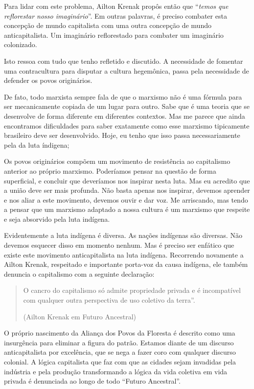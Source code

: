 Para lidar com este problema, Ailton Krenak propôs então que “\textit{temos que reflorestar nosso imaginário}”. Em outras palavras, é preciso combater esta concepção de mundo capitalista com uma outra concepção de mundo anticapitalista. Um imaginário reflorestado para combater um imaginário colonizado.

Isto ressoa com tudo que tenho refletido e discutido. A necessidade de fomentar uma contracultura para disputar a cultura hegemônica, passa pela necessidade de defender os povos originários.

De fato, todo marxista sempre fala de que o marxismo não é uma fórmula para ser mecanicamente copiada de um lugar para outro. Sabe que é uma teoria que se desenvolve de forma diferente em diferentes contextos. Mas me parece que ainda encontramos dificuldades para saber exatamente como esse marxismo tipicamente brasileiro deve ser desenvolvido. Hoje, eu tenho que isso passa necessariamente pela da luta índigena;

Os povos originários compõem um movimento de resistência ao capitalismo anterior ao próprio marxismo. Poderíamos pensar na questão de forma superficial, e concluir que deveríamos nos inspirar nesta luta. Mas eu acredito que a união deve ser mais profunda. Não basta apenas nos inspirar, devemos aprender e nos aliar a este movimento, devemos ouvir e dar voz. Me arriscando, mas tendo a pensar que um marxismo adaptado a nossa cultura é um marxismo que respeite e seja absorvido pela luta indígena.

Evidentemente a luta indígena é diversa. As nações indígenas são diversas. Não devemos esquecer disso em momento nenhum. Mas é preciso ser enfático que existe este movimento anticapitalista na luta indígena. Recorrendo novamente a Ailton Krenak, respeitado e importante porta-voz da causa indígena, ele também denuncia o capitalismo com a seguinte declaração:

\begin{quote}
O cancro do capitalismo só admite propriedade privada e é incompatível com qualquer outra perspectiva de uso coletivo da terra”.

(Ailton Krenak em Futuro Ancestral)
\end{quote}

O próprio nascimento da Aliança dos Povos da Floresta é descrito como uma insurgência para eliminar a figura do patrão. Estamos diante de um discurso anticapitalista por excelência, que se nega a fazer coro com qualquer discurso colonial. A lógica capitalista que faz com que as cidades sejam invadidas pela indústria e pela produção transformando a lógica da vida coletiva em vida privada é denunciada ao longo de todo “Futuro Ancestral”.

